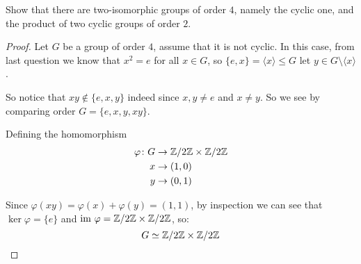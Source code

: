     \begin{exercise}
    Show that there are two-isomorphic groups of order $4$, namely the cyclic one, and the product of two cyclic groups of order $2$.

    \begin{proof}
        Let $G$ be a group of order $4$, assume that it is not cyclic. In this case, from last question we know that $x^2 = e$ for all $x\in G$, so $\{e,x\} = \langle x\rangle\leq G$ let $y\in G\setminus\langle x\rangle$. 
        
        So notice that $xy \not\in \{e,x,y\}$ indeed since $x,y\not=e$ and $x\neq y$. So we see by comparing order $G = \{e,x,y,xy\}$.
        
        Defining the homomorphism\begin{align*}
            \varphi \colon G&\rightarrow \mathbb{Z}/2\mathbb{Z} \times \mathbb{Z}/2\mathbb{Z}\\
                           x&\rightarrow (1,0)\\
                           y&\rightarrow (0,1) 
        \end{align*}

        Since $\varphi(xy) = \varphi(x)+\varphi(y) = (1,1)$, by inspection we can see that $\ker \varphi = \{e\}$ and $\text{im } \varphi = \mathbb{Z}/2\mathbb{Z} \times \mathbb{Z}/2\mathbb{Z}$, so:\begin{equation*}
            G\simeq \mathbb{Z}/2\mathbb{Z} \times \mathbb{Z}/2\mathbb{Z}
        \end{equation*}
    \end{proof}
    \end{exercise}

